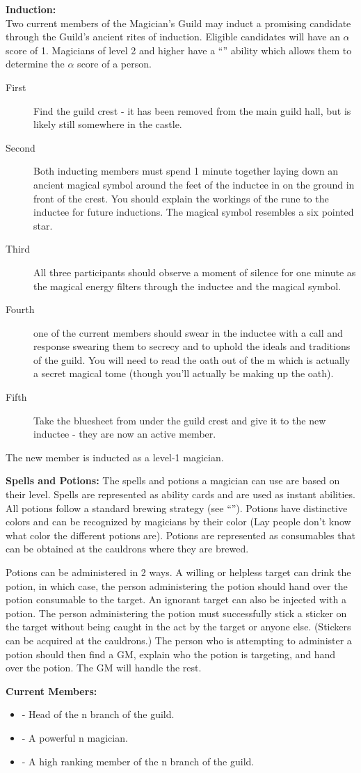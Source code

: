 \documentclass[blue]{NeptuneBall}
\begin{document}
{\bf Induction:}\\
Two current members of the Magician's Guild may induct a promising candidate through the Guild's ancient rites of induction. Eligible candidates will have an $\alpha$ score of 1. Magicians of level 2 and higher have a ``\aPerceive{}'' ability which allows them to determine the $\alpha$ score of a person.
\begin{description}
\item[First] Find the guild crest - it has been removed from the main guild hall, but is likely still somewhere in the castle. 
\item[Second] Both inducting members must spend 1 minute together laying down an ancient magical symbol around the feet of the inductee in \iChalk{} on the ground in front of the crest. You should explain the workings of the rune to the inductee for future inductions. The magical symbol resembles a six pointed star. 
\item[Third] All three participants should observe a moment of silence for one minute as the magical energy filters through the inductee and the magical symbol. \item[Fourth] one of the current members should swear in the inductee with a call and response swearing them to secrecy and to uphold the ideals and traditions of the guild. You will need to read the oath out of the \iBook{}m which is actually a secret magical tome (though you'll actually be making up the oath). 
\item[Fifth] Take the bluesheet from under the guild crest and give it to the new inductee - they are now an active member.
\end{description}

The new member is inducted as a level-1 magician.

{\bf Spells and Potions:}
The spells and potions a magician can use are based on their level. Spells are represented as ability cards and are used as instant abilities. All potions follow a standard brewing strategy (see ``\gPotions{}''). Potions have distinctive colors and can be recognized by magicians by their color (Lay people don't know what color the different potions are). Potions are represented as consumables that can be obtained at the cauldrons where they are brewed.

Potions can be administered in 2 ways. A willing or helpless target can drink the potion, in which case, the person administering the potion should hand over the potion consumable to the target. An ignorant target can also be injected with a potion. The person administering the potion must successfully stick a sticker on the target without being caught in the act by the target or anyone else. (Stickers can be acquired at the cauldrons.) The person who is attempting to administer a potion should then find a GM, explain who the potion is targeting, and hand over the potion. The GM will handle the rest.

{\bf Current Members:}
\begin{itemize}
\item \cManta{} - Head of the \pAtlantis{}n branch of the guild.
\item \cWitch{\MYname} - A powerful \pAtlantis{}n magician.
\item \cBodyguard{} - A high ranking member of the \pPacifica{}n branch of the guild.
\end{itemize}
\end{document}
